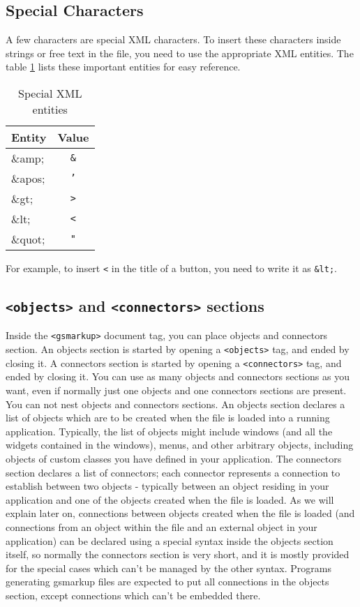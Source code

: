 \subsection{Special Characters}
A few characters are special XML characters.  To insert these
characters inside strings or free text in the file, you need to use
the appropriate XML entities.  The table \ref{XML-entities} lists
these important entities for easy reference.
\begin{table}
\caption{\label{XML-entities}Special XML entities}
\begin{tabular}{l|c}
Entity  & Value\\
\hline
\&amp;  & \texttt{\&} \\
\&apos; & \texttt{'} \\
\&gt;   & \texttt{>} \\
\&lt;   & \texttt{<} \\
\&quot; & \texttt{"} \\
\end{tabular}
\end{table}
For example, to insert \texttt{<} in the title of a button, you need
to write it as \texttt{\&lt;}.

\subsection{\texttt{<objects>} and \texttt{<connectors>} sections}

Inside the \texttt{<gsmarkup>} document tag, you can place objects and
connectors section.  An objects section is started by opening a
\texttt{<objects>} tag, and ended by closing it.  A connectors section
is started by opening a \texttt{<connectors>} tag, and ended by
closing it.  You can use as many objects and connectors sections as
you want, even if normally just one objects and one connectors
sections are present.  You can not nest objects and connectors
sections.  An objects section declares a list of objects which are to
be created when the file is loaded into a running application.
Typically, the list of objects might include windows (and all the
widgets contained in the windows), menus, and other arbitrary objects,
including objects of custom classes you have defined in your
application.  The connectors section declares a list of connectors;
each connector represents a connection to establish between two
objects - typically between an object residing in your application and
one of the objects created when the file is loaded.  As we will
explain later on, connections between objects created when the file is
loaded (and connections from an object within the file and an external
object in your application) can be declared using a special syntax
inside the objects section itself, so normally the connectors section
is very short, and it is mostly provided for the special cases which
can't be managed by the other syntax.  Programs generating gsmarkup files
are expected to put all connections in the objects section, except
connections which can't be embedded there.

